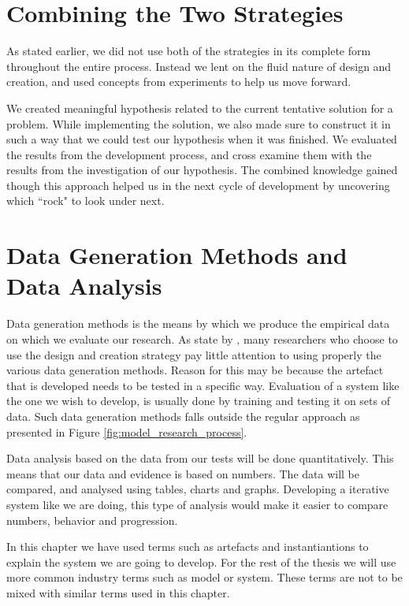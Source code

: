 \section{Combining the Two Strategies}
\label{sec:combining_the_two_strategies}
As stated earlier, we did not use both of the strategies in its complete form throughout the entire process. Instead we lent on the fluid nature of design and creation, and used concepts from experiments to help us move forward. 

We created meaningful hypothesis related to the current tentative solution for a problem. While implementing the solution, we also made sure to construct it in such a way that we could test our hypothesis when it was finished. We evaluated the results from the development process, and cross examine them with the results from the investigation of our hypothesis. The combined knowledge gained though this approach helped us in the next cycle of development by uncovering which ``rock" to look under next.


\section{Data Generation Methods and Data Analysis}
\label{sec:data_generation_methods_and_data_analysis}
Data generation methods is the means by which we produce the empirical data on which we evaluate our research. As state by \citep{oates2005researching}, many researchers who choose to use the design and creation strategy pay little attention to using properly the various data generation methods. Reason for this may be because the artefact that is developed needs to be tested in a specific way. Evaluation of a system like the one we wish to develop, is usually done by training and testing it on sets of data. Such data generation methods falls outside the regular approach as presented in Figure \ref{fig:model_research_process}.

Data analysis based on the data from our tests will be done quantitatively. This means that our data and evidence is based on numbers. The data will be compared, and analysed using tables, charts and graphs. Developing a iterative system like we are doing, this type of analysis would make it easier to compare numbers, behavior and progression.

\vspace{5mm}
\begin{note}
    In this chapter we have used terms such as artefacts and instantiantions to explain the system we are going to develop. For the rest of the thesis we will use more common industry terms such as model or system. These terms are not to be mixed with similar terms used in this chapter. 
\end{note}